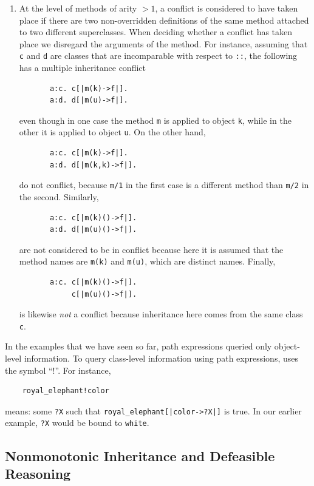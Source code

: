\documentclass[11pt]{article}
\newcommand{\ERGO}{\mbox{\smaller{\ensuremath{\cal{E}}\smaller{{\sc{RGO}}}}}\xspace}
\newcommand{\FLSYSTEM}{\ERGO}
\begin{document}
\begin{enumerate}
\item At the level of methods of arity $>1$, a conflict is considered to have
  taken place if there are two non-overridden definitions of the same method
  attached to two different superclasses. When deciding whether a conflict
  has taken place we disregard the arguments of the method. For instance,
  assuming that \texttt{c} and \texttt{d} are classes that are
  incomparable with
  respect to \texttt{::}, the following has a multiple inheritance conflict 
\begin{verbatim}
       a:c. c[|m(k)->f|].    
       a:d. d[|m(u)->f|].     
\end{verbatim}
  even though in one case
  the method {\tt m} is applied to object {\tt k}, while in the other it is
  applied to object {\tt u}. 
  On the other hand,
\begin{verbatim}
       a:c. c[|m(k)->f|].    
       a:d. d[|m(k,k)->f|].     
\end{verbatim}
  do not conflict, because {\tt m/1} in the first case is a different
  method than {\tt m/2} in the second. Similarly,
\begin{verbatim}
       a:c. c[|m(k)()->f|].    
       a:d. d[|m(u)()->f|].     
\end{verbatim}
  are not considered to be in conflict because here it is assumed that the
  method names are {\tt m(k)} and {\tt m(u)}, which are distinct names.
  Finally,
\begin{verbatim}
       a:c. c[|m(k)()->f|].    
            c[|m(u)()->f|].     
\end{verbatim}
  is likewise \emph{not} a conflict because inheritance here comes from the same
  class \texttt{c}.
\end{enumerate}

In the examples that we have seen so far, path expressions queried only
object-level information. To query class-level information using path
expressions, \FLSYSTEM uses the symbol ``!''. For instance,
\begin{verbatim}
    royal_elephant!color
\end{verbatim}
means: some \texttt{?X}  such that \texttt{royal\_elephant[|color->?X|]} is
true.  In our earlier example, \texttt{?X} would be bound to
\texttt{white}.  

\subsection{Nonmonotonic Inheritance and Defeasible Reasoning}
\end{document}
